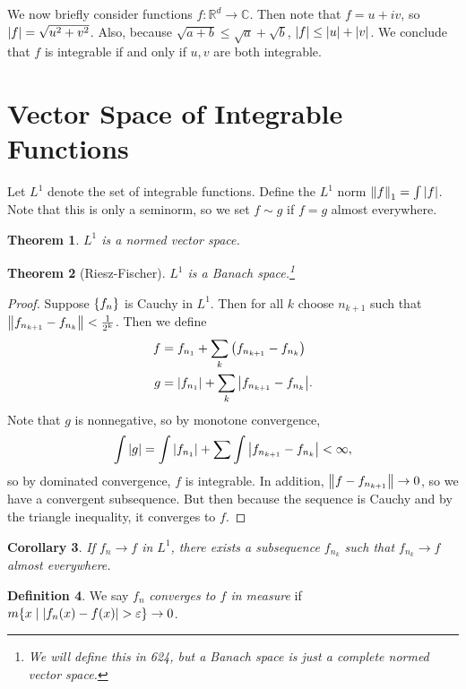 \documentclass[leqno, openany]{memoir}
\newtheorem{thm}{Theorem}[chapter]
\newtheorem{cor}[thm]{Corollary}
\theoremstyle{definition}
\newtheorem{defn}[thm]{Definition}
\theoremstyle{remark}
\theoremstyle{plain}
\theoremstyle{definition}
\theoremstyle{remark}
\newcommand{\R}{\mathbb{R}}
\newcommand{\C}{\mathbb{C}}
\newcommand{\ep}{\varepsilon}
\begin{document}
We now briefly consider functions $f: \R^d \to \C$. Then note that $f = u+iv$,
so $\abs{f} = \sqrt{u^2 + v^2}$. Also, because $\sqrt{a+b} \leq \sqrt{a} +
\sqrt{b}$, $\abs{f} \leq \abs{u} + \abs{v}$. We conclude that $f$ is integrable
if and only if $u,v$ are both integrable.

\section{Vector Space of Integrable Functions}%
\label{sec:vector_space_of_integrable_functions}

Let $L^1$ denote the set of integrable functions. Define the $L^1$ norm
$\norm{f}_1 = \int \abs{f}$. Note that this is only a seminorm, so we set $f
\sim g$ if $f = g$ almost everywhere.

\begin{thm} $L^1$ is a normed vector space.  \end{thm}

\begin{thm}[Riesz-Fischer] $L^1$ is a Banach space.\footnote{We will define
this in 624, but a Banach space is just a complete normed vector space.}
\end{thm}

\begin{proof} Suppose $\qty{f_n}$ is Cauchy in $L^1$. Then for all $k$ choose
    $n_{k+1}$ such that $\norm{f_{n_{k+1}} - f_{n_k}} < \frac{1}{2^k}$. Then we
    define \begin{align*} f &= f_{n_1} + \sum_k \qty(f_{n_{k+1}} - f_{n_k}) \\
        g &= \abs{f_{n_1}} + \sum_k \abs{f_{n_{k+1}} - f_{n_k}}.  \end{align*}
        Note that $g$ is nonnegative, so by monotone convergence, \[ \int
        \abs{g} = \int \abs{f_{n_1}} + \sum \int \abs{f_{n_{k+1}} - f_{n_k}} <
    \infty, \] so by dominated convergence, $f$ is integrable. In addition,
    $\norm{f - f_{n_{k+1}}} \to 0$, so we have a convergent subsequence. But
    then because the sequence is Cauchy and by the triangle inequality, it
    converges to $f$.  \end{proof}

\begin{cor} If $f_n \to f$ in $L^1$, there exists a subsequence $f_{n_k}$ such
that $f_{n_k} \to f$ almost everywhere.  \end{cor}

\begin{defn} We say $f_n$ \textit{converges to $f$ in measure} if $m \qty{x
\mid \abs{f_n(x) - f(x)} > \ep} \to 0$.  \end{defn}
\end{document}
